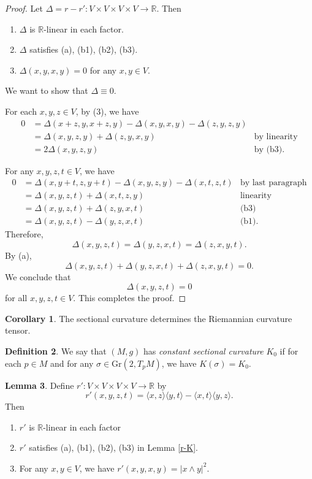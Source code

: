 \documentclass{amsart}
\numberwithin{equation}{section}
\newcommand{\bR}{\mathbb{R}}
\theoremstyle{definition}
\newtheorem{definition}{Definition} [section]
\theoremstyle{theorem}
\newtheorem{corollary}[definition]{Corollary}
\newtheorem{lemma}[definition]{Lemma}
\begin{document}
\begin{proof}
Let $\Delta = r - r' : V \times V \times V \times V \to \bR$. Then 
\begin{enumerate}
\item[(1)] $\Delta$ is $\mathbb{R}$-linear in each factor. 
\item[(2)] $\Delta$ satisfies (a), (b1), (b2), (b3).  
\item[(3)] $\Delta(x,y,x,y) = 0$ for any $x,y \in V$.  
\end{enumerate}
We want to show that $\Delta \equiv 0$. 

For each $x,y,z \in V$, by (3), we have 
\begin{align*}
0  &=\Delta(x + z, y, x + z, y) - \Delta(x,y, x,y) - \Delta(z,y,z,y) \\
&= \Delta(x,y,z,y) + \Delta(z,y,x,y) &\text{by linearity}\\
&= 2 \Delta(x,y,z,y) &\text{by (b3).}
\end{align*}

For any $x,y,z,t \in V$, we have 
\begin{align*}
0 &= \Delta(x, y + t, z, y+t) - \Delta(x,y,z,y) - \Delta(x,t,z,t) &\text{by last paragraph} \\
&= \Delta(x,y,z,t) + \Delta(x,t,z,y) &\text{linearity} \\
&= \Delta(x,y,z,t) + \Delta(z,y,x,t) &\text{(b3)} \\
&= \Delta(x,y,z,t) - \Delta(y,z,x,t) &\text{(b1)}. 
\end{align*}
Therefore,
$$
\Delta(x,y,z,t) = \Delta(y,z,x,t) = \Delta(z,x,y,t).
$$
By (a), 
$$
\Delta(x,y,z,t) + \Delta(y,z,x,t) + \Delta(z,x,y,t) =0.
$$
We conclude that
$$
\Delta(x,y,z,t)=0
$$
for all $x,y,z,t\in V$. This completes the proof.
\end{proof}

\begin{corollary}
The sectional curvature determines the Riemannian curvature tensor. 
\end{corollary}


\begin{definition}
We say that $(M,g)$ has {\em constant sectional curvature} $K_0$ if 
for each $p \in M$ and for any $\sigma \in \text{Gr}(2, T_pM)$, we have $K(\sigma) = K_0$. 
\end{definition}

\begin{lemma}
Define $r': V \times V \times V \times V \to \mathbb{R}$ by 
\[
r'(x,y,z,t)= \langle x,z \rangle \langle y,t \rangle - \langle x,t \rangle \langle y,z \rangle. 
\]
Then 
\begin{enumerate}
\item[(1)] $r'$ is $\bR$-linear in each factor
\item[(2)] $r'$ satisfies (a), (b1), (b2), (b3) in Lemma \ref{r-K}. 
\item[(3)] For any $x,y \in V$, we have $r'(x,y, x,y) = |x\wedge y|^2$. 
\end{enumerate}
\end{lemma}
\end{document}
